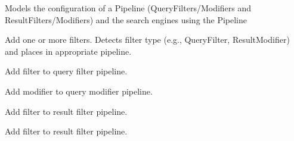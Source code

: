 \documentclass[letterpaper,10pt,english]{sphinxmanual}
\begin{document}
\begin{fulllineitems}
\label{api3.0:puppy.pipeline.PipelineService}
Models the configuration of a Pipeline (QueryFilters/Modifiers and ResultFilters/Modifiers) and the search engines using the Pipeline

\begin{fulllineitems}
\label{api3.0:puppy.pipeline.PipelineService.add_filters}
Add one or more filters. Detects filter type (e.g., QueryFilter, ResultModifier) and places in appropriate pipeline.

\end{fulllineitems}


\begin{fulllineitems}
\label{api3.0:puppy.pipeline.PipelineService.add_query_filter}
Add filter to query filter pipeline.

\end{fulllineitems}


\begin{fulllineitems}
\label{api3.0:puppy.pipeline.PipelineService.add_query_modifier}
Add modifier to query modifier pipeline.

\end{fulllineitems}


\begin{fulllineitems}
\label{api3.0:puppy.pipeline.PipelineService.add_result_filter}
Add filter to result filter pipeline.

\end{fulllineitems}


\begin{fulllineitems}
\label{api3.0:puppy.pipeline.PipelineService.add_result_modifier}
Add filter to result filter pipeline.


\end{fulllineitems}
\end{fulllineitems}
\end{document}

